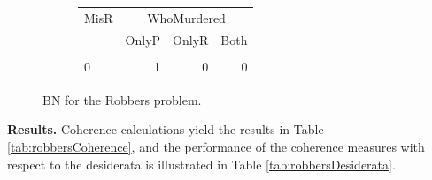 \documentclass[
  10pt,
]{scrartcl}
\begin{document}
\begin{figure}[H]
\begin{subfigure}[!ht]{0.4\textwidth}
\begin{tabular}{lrrr}
\toprule
\multicolumn{1}{c}{MisR} & \multicolumn{3}{c}{WhoMurdered} \\
  & OnlyP & OnlyR & Both\\
\midrule
\cellcolor{gray!6}{1} & \cellcolor{gray!6}{0} & \cellcolor{gray!6}{1} & \cellcolor{gray!6}{1}\\
0 & 1 & 0 & 0\\
\bottomrule
\end{tabular}


\endgroup{}


\end{subfigure}
\caption{BN for the \textsf{Robbers} problem.}
\label{fig:Robbers}
\end{figure}

\textbf{Results.} Coherence calculations yield the results in Table \ref{tab:robbersCoherence}, and the performance of the coherence measures with respect to the desiderata is illustrated in Table \ref{tab:robbersDesiderata}.

\begin{table}[H]

\caption{\label{tab:robbersCoherence}Coherence scores in the Robbers scenario (rounded).}
\centering
{}
\end{table}

\begin{table}[H]

\caption{\label{tab:robbersDesiderata}Desiderata satisfaction in the Robbers problem.}
\centering
{}
\end{table}
\end{document}
